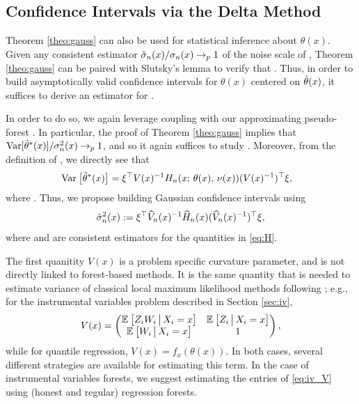 \documentclass[aos]{imsart}
\theoremstyle{plain}
\theoremstyle{definition}
\theoremstyle{remark}
\begin{document}
\begin{CJK}{UTF8}{gbsn}
\section{Confidence Intervals via the Delta Method}
\label{sec:delta_method}

Theorem \ref{theo:gauss} can also be used for statistical inference about $\theta(x)$. Given any
consistent estimator $\hat{\sigma}_n(x)/\sigma_n(x) \rightarrow_p 1$ of the noise scale
of , Theorem \ref{theo:gauss} can be paired with Slutsky's lemma
to verify that
.
Thus, in order to build asymptotically valid confidence intervals for $\theta(x)$ centered on $\hat{\theta}(x)$,
it suffices to derive an estimator for .

In order to do so, we again leverage coupling with our approximating pseudo-forest .
In particular, the proof of Theorem \ref{theo:gauss} implies that 
$\text{Var}[\tilde{\theta}^*(x)]/\sigma^2_n(x) \rightarrow_p 1$, and so it again suffices to study
 . Moreover, from the definition of , we directly see that
\begin{equation}
\label{eq:H}
\begin{split}
&\Var{\ttheta^*(x)} = \xi^\top V(x)^{-1} H_n(x; \, \theta(x), \, \nu(x)) (V(x)^{-1})^\top \xi,
\end{split}
\end{equation}
where .
Thus, we propose building Gaussian confidence intervals using
\begin{equation}
\label{eq:sigma_hat}
\hsigma_n^2(x) := \xi^\top \hV_n(x)^{-1} \hH_n(x) (\hV_n(x)^{-1})^\top \xi,
\end{equation}
where  and  are consistent estimators
for the quantities in \eqref{eq:H}.

The first quanitity $V(x)$ is a problem specific curvature parameter, and is
not directly linked to forest-based methods. It is the same quantity that is needed
to estimate variance of classical local maximum likelihood methods following \citet{newey1994kernel};
e.g., for the instrumental variables problem described in Section \ref{sec:iv},
\begin{equation}
\label{eq:iv_V}
V(x) = \begin{pmatrix}
\EE{Z_iW_i\cond X_i = x} & \EE{Z_i\cond X_i = x} \\
\EE{W_i\cond X_i = x} & 1
\end{pmatrix},
\end{equation}
while for quantile regression, $V(x) = f_x(\theta(x))$.  In both cases,
several different strategies are available for estimating this term. In the
case of instrumental variables forests, we suggest estimating the
entries of \eqref{eq:iv_V} using (honest and regular) regression forests.


\end{CJK}
\end{document}
